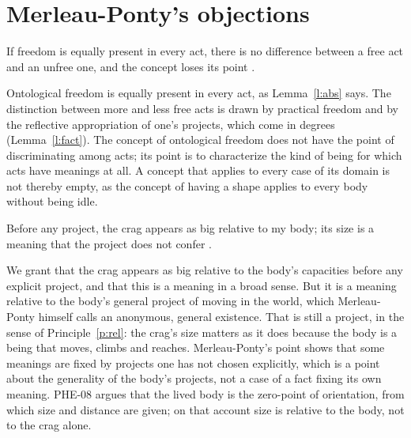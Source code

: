 \documentclass{situationist-preprint}
\begin{document}
\section{Merleau-Ponty's objections}

\begin{objection}\label{o:nowhere}
If freedom is equally present in every act, there is no difference between a free act and an unfree one, and the concept loses its point \citep{MerleauPonty1945}.
\end{objection}

\begin{reply}
Ontological freedom is equally present in every act, as Lemma~\ref{l:abs} says. The distinction between more and less free acts is drawn by practical freedom and by the reflective appropriation of one's projects, which come in degrees (Lemma~\ref{l:fact}). The concept of ontological freedom does not have the point of discriminating among acts; its point is to characterize the kind of being for which acts have meanings at all. A concept that applies to every case of its domain is not thereby empty, as the concept of having a shape applies to every body without being idle.
\end{reply}

\begin{objection}\label{o:crag}
Before any project, the crag appears as big relative to my body; its size is a meaning that the project does not confer \citep{MerleauPonty1945}.
\end{objection}

\begin{reply}
We grant that the crag appears as big relative to the body's capacities before any explicit project, and that this is a meaning in a broad sense. But it is a meaning relative to the body's general project of moving in the world, which Merleau-Ponty himself calls an anonymous, general existence. That is still a project, in the sense of Principle~\ref{p:rel}: the crag's size matters as it does because the body is a being that moves, climbs and reaches. Merleau-Ponty's point shows that some meanings are fixed by projects one has not chosen explicitly, which is a point about the generality of the body's projects, not a case of a fact fixing its own meaning. PHE-08 argues that the lived body is the zero-point of orientation, from which size and distance are given; on that account size is relative to the body, not to the crag alone.
\end{reply}
\end{document}
